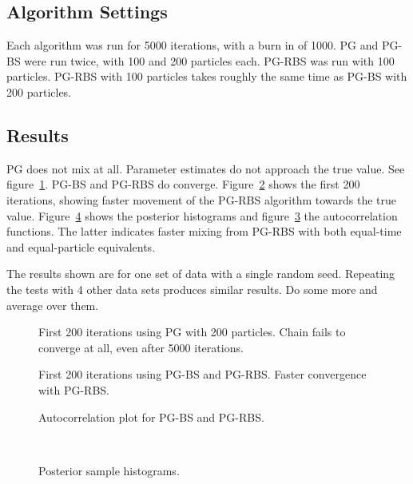 \documentclass{article}
\begin{document}
\subsection{Algorithm Settings}
Each algorithm was run for 5000 iterations, with a burn in of 1000. PG and PG-BS were run twice, with 100 and 200 particles each. PG-RBS was run with 100 particles. PG-RBS with 100 particles takes roughly the same time as PG-BS with 200 particles.

\subsection{Results}
PG does not mix at all. Parameter estimates do not approach the true value. See figure~\ref{fig:chain_init_fail}. PG-BS and PG-RBS do converge. Figure~\ref{fig:chain_init} shows the first 200 iterations, showing faster movement of the PG-RBS algorithm towards the true value. Figure~\ref{fig:sample_hist} shows the posterior histograms and figure~\ref{fig:acf} the autocorrelation functions. The latter indicates faster mixing from PG-RBS with both equal-time and equal-particle equivalents.

The results shown are for one set of data with a single random seed. Repeating the tests with 4 other data sets produces similar results. {\meta Do some more and average over them.}

\begin{figure}
\centering

\caption{First 200 iterations using PG with 200 particles. Chain fails to converge at all, even after 5000 iterations.}
\label{fig:chain_init_fail}
\end{figure}

\begin{figure}
\centering

\caption{First 200 iterations using PG-BS and PG-RBS. Faster convergence with PG-RBS.}
\label{fig:chain_init}
\end{figure}

\begin{figure}
\centering

\caption{Autocorrelation plot for PG-BS and PG-RBS.}
\label{fig:acf}
\end{figure}

\begin{figure}
\centering
\subfloat[PG-BS (N=100)]{  }
\subfloat[PG-BS (N=200)]{  } \\
\subfloat[PG-RBS (N=100)]{  }
\caption{Posterior sample histograms.}
\label{fig:sample_hist}
\end{figure}
\end{document}
